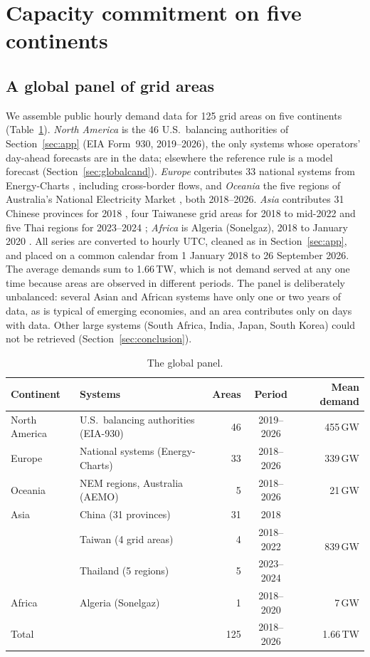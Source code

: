 \section{Capacity commitment on five continents}\label{sec:global}

\subsection{A global panel of grid areas}

We assemble public hourly demand data for 125 grid areas on five continents (Table~\ref{tab:globaldata}).
\emph{North America} is the 46 U.S.\ balancing authorities of Section~\ref{sec:app} (EIA Form~930, 2019--2026), the only systems whose operators' day-ahead forecasts are in the data; elsewhere the reference rule is a model forecast (Section~\ref{sec:globalcand}).
\emph{Europe} contributes 33 national systems from Energy-Charts \citep{EnergyCharts}, including cross-border flows, and \emph{Oceania} the five regions of Australia's National Electricity Market \citep{AEMO}, both 2018--2026.
\emph{Asia} contributes 31 Chinese provinces for 2018 \citep{ChinaLoad2023}, four Taiwanese grid areas for 2018 to mid-2022 \citep{TaiwanLoad2023} and five Thai regions for 2023--2024 \citep{ThaiLoad2025}; \emph{Africa} is Algeria (Sonelgaz), 2018 to January 2020 \citep{AlgeriaLoad2023}.
All series are converted to hourly UTC, cleaned as in Section~\ref{sec:app}, and placed on a common calendar from 1 January 2018 to 26 September 2026.
The average demands sum to 1.66\,TW, which is not demand served at any one time because areas are observed in different periods.
The panel is deliberately unbalanced: several Asian and African systems have only one or two years of data, as is typical of emerging economies, and an area contributes only on days with data.
Other large systems (South Africa, India, Japan, South Korea) could not be retrieved (Section~\ref{sec:conclusion}).

\begin{table}[t]
\centering
\caption{The global panel.}\label{tab:globaldata}
\small
\begin{tabular}{@{}llrcr@{}}
\toprule
Continent & Systems & Areas & Period & Mean demand \\
\midrule
North America & U.S.\ balancing authorities (EIA-930) & 46 & 2019--2026 & 455\,GW \\
Europe & National systems (Energy-Charts) & 33 & 2018--2026 & 339\,GW \\
Oceania & NEM regions, Australia (AEMO) & 5 & 2018--2026 & 21\,GW \\
Asia & China (31 provinces) & 31 & 2018 & \multirow{3}{*}{839\,GW} \\
 & Taiwan (4 grid areas) & 4 & 2018--2022 & \\
 & Thailand (5 regions) & 5 & 2023--2024 & \\
Africa & Algeria (Sonelgaz) & 1 & 2018--2020 & 7\,GW \\
\midrule
Total & & 125 & 2018--2026 & 1.66\,TW \\
\bottomrule
\end{tabular}
\end{table}

